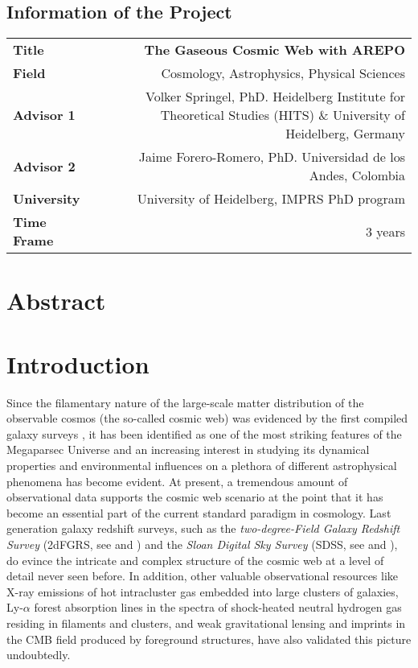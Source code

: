 \documentclass[a4,useAMS,usenatbib,usegraphicx,12pt]{article}
\begin{document}
\subsection*{Information of the Project}
\begin{tabular}{L!{\VRule}R}
\bf Title		& \bf The Gaseous Cosmic Web with AREPO\\
\bf Field		& Cosmology, Astrophysics, Physical Sciences \\
\bf Advisor 1	& Volker Springel, PhD. Heidelberg Institute for Theoretical Studies (HITS) \& University of Heidelberg, Germany \\
\bf Advisor 2	& Jaime Forero-Romero, PhD. Universidad de los Andes, Colombia \\
\bf University	& University of Heidelberg, IMPRS PhD program \\
\bf Time Frame	& 3 years \\
\end{tabular}
\normalsize


\section{Abstract}
\newpage

\section{Introduction}


Since the filamentary nature of the large-scale matter distribution of the 
observable cosmos (the so-called cosmic web) was evidenced by the first compiled 
galaxy surveys \citep{Chincarini75, Gregory78, Einasto80M, Einasto80N, 
Kirshner81, Kirshner87}, it has been identified as one of the most striking 
features of the Megaparsec Universe and an increasing interest in studying its 
dynamical properties and environmental influences on a plethora of different 
astrophysical phenomena has become evident. At present, a tremendous amount of 
observational data supports the cosmic web scenario at the point that it has 
become an essential part of the current standard paradigm in cosmology. Last 
generation galaxy redshift surveys, such as the \textit{two-degree-Field Galaxy 
Redshift Survey} (2dFGRS, see \citet{Colless01} and \citet{Colless03}) and the 
\textit{Sloan Digital Sky Survey} (SDSS, see \citet{York00} and 
\citet{Abazajian09}), do evince the intricate and complex structure of the 
cosmic web at a level of detail never seen before. In addition, other valuable 
observational resources like X-ray emissions of hot intracluster gas embedded 
into large clusters of galaxies, Ly-$\alpha$ forest absorption lines in the 
spectra of shock-heated neutral hydrogen gas residing in filaments and clusters, 
and weak gravitational lensing and imprints in the CMB field produced by 
foreground structures, have also validated this picture undoubtedly.
\end{document}

